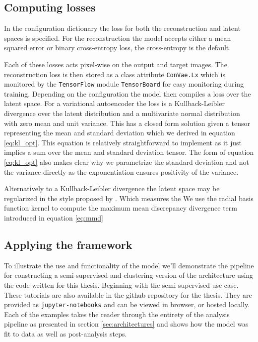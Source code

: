 \subsection{Computing losses}

In the configuration dictionary the loss for both the reconstruction and latent spaces is specified. For the reconstruction the model accepts either a mean squared error or binary cross-entropy loss, the cross-entropy is the default. 

Each of these losses acts pixel-wise on the output and target images. The reconstruction loss is then stored as a class attribute \lstinline{ConVae.Lx} which is monitored by the \lstinline{TensorFlow} module \lstinline{TensorBoard} for easy monitoring during training. Depending on the configuration the model then compiles a loss over the latent space. For a variational autoencoder the loss is a Kullback-Leibler divergence over the latent distribution and a multivariate normal distribution with zero mean and unit variance. This has a closed form solution given a tensor representing the mean and standard deviation which we derived in equation \ref{eq:kl_opt}. This equation is relatively straightforward to implement as it just implies a sum over the mean and standard deviation tensor. The form of equation \ref{eq:kl_opt} also makes clear why we parametrize the standard deviation and not the variance directly as the exponentiation ensures positivity of the variance. 

Alternatively to a Kullback-Leibler divergence the latent space may be regularized in the style proposed by \citet{Zhao}. Which measures the  We use the radial basis function kernel to compute the maximum mean discrepancy divergence term introduced in equation \ref{eq:mmd} 

\subsection{Applying the framework}

To illustrate the use and functionality of the model we'll demonstrate the pipeline for constructing a semi-supervised and clustering version of the architecture using the code written for this thesis. Beginning with the semi-supervised use-case. These tutorials are also available in the github repository for the thesis. They are provided as \lstinline{jupyter-notebooks} and can be viewed in browser, or hosted locally. Each of the examples takes the reader through the entirety of the analysis pipeline as presented in section \ref{sec:architectures} and shows how the model was fit to data as well as post-analysis steps. 

